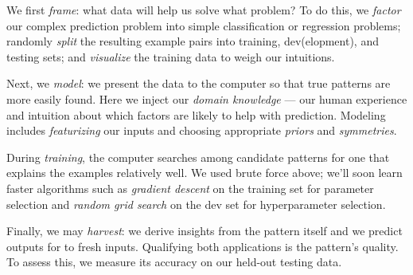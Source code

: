 
        We first \emph{frame}: what data will help us solve what problem?  To
        do this, we \emph{factor} our complex prediction problem into simple
        classification or regression problems; randomly \emph{split} the
        resulting example pairs into training, dev(elopment), and testing sets;
        and \emph{visualize} the training data to weigh our intuitions.

        Next, we \emph{model}: we present the data to the computer so that
        true patterns are more easily found.
        Here we inject our \emph{domain knowledge} --- our human experience and
        intuition about which factors are likely to help with prediction.
        Modeling includes \emph{featurizing} our inputs and choosing
        appropriate \emph{priors} and \emph{symmetries}.

        During \emph{training}, the computer searches among candidate patterns
        for one that explains the examples relatively well.
        We used brute force above; we'll soon learn faster algorithms
        such as \emph{gradient descent} on the training set for parameter
        selection and \emph{random grid search} on the dev set for
        hyperparameter selection.

        Finally, we may \emph{harvest}: we derive insights from the pattern
        itself\bcirc{}
        and we predict outputs for to fresh inputs.
        Qualifying both applications is the pattern's quality.  To assess this,
        we measure its accuracy on our held-out testing data.


